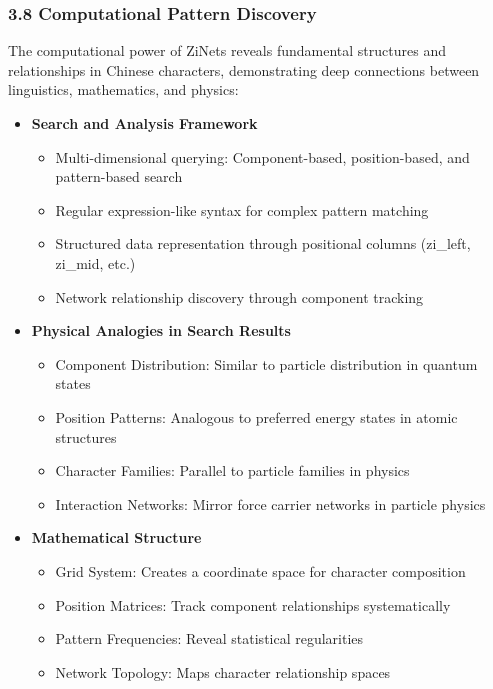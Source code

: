 \documentclass[
  11pt,
  letterpaper,
]{article}
\providecommand{\tightlist}{%
  \setlength{\itemsep}{0pt}\setlength{\parskip}{0pt}}
\begin{document}
\hypertarget{computational-pattern-discovery}{%
\subsubsection{3.8 Computational Pattern
Discovery}\label{computational-pattern-discovery}}

The computational power of ZiNets reveals fundamental structures and
relationships in Chinese characters, demonstrating deep connections
between linguistics, mathematics, and physics:

\begin{itemize}
\tightlist
\item
  \textbf{Search and Analysis Framework}

  \begin{itemize}
  \tightlist
  \item
    Multi-dimensional querying: Component-based, position-based, and
    pattern-based search
  \item
    Regular expression-like syntax for complex pattern matching
  \item
    Structured data representation through positional columns (zi\_left,
    zi\_mid, etc.)
  \item
    Network relationship discovery through component tracking
  \end{itemize}
\item
  \textbf{Physical Analogies in Search Results}

  \begin{itemize}
  \tightlist
  \item
    Component Distribution: Similar to particle distribution in quantum
    states
  \item
    Position Patterns: Analogous to preferred energy states in atomic
    structures
  \item
    Character Families: Parallel to particle families in physics
  \item
    Interaction Networks: Mirror force carrier networks in particle
    physics
  \end{itemize}
\item
  \textbf{Mathematical Structure}

  \begin{itemize}
  \tightlist
  \item
    Grid System: Creates a coordinate space for character composition
  \item
    Position Matrices: Track component relationships systematically
  \item
    Pattern Frequencies: Reveal statistical regularities
  \item
    Network Topology: Maps character relationship spaces
  \end{itemize}
\end{itemize}
\end{document}
